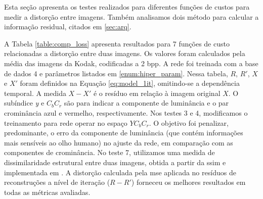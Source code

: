 Esta seção apresenta os testes realizados para diferentes funções de custos para medir a distorção entre imagens. Também analisamos dois método para calcular a informação residual, citados em \ref{sec:arq}.    


A Tabela \ref{table:comp_loss} apresenta resultados para 7 funções de custo relacionadas a distorção entre duas imagens.  Os valores foram calculados pela média das imagens da Kodak, codificadas a 2 bpp. A rede foi treinada com a base de dados 4 e parâmetros listados em \ref{enum:hiper_param}. Nessa tabela, $R$, $R'$, $X$ e $X'$ foram definidos na Equação \ref{eq:model_1it}, omitindo-se a dependência temporal. A medida $X-X'$ é o resíduo em relação à imagem original $X$.  
O subíndice \textit{y} e \textit{$C_bC_r$} são para indicar a componente de luminância e o par crominância azul e vermelho, respectivamente. Nos testes 3 e 4, modificamos o treinamento para rede operar no espaço $YC_bC_r$. O objetivo foi penalizar, predominante, o erro da componente de luminância (que contém informações mais sensíveis ao olho humano) no ajuste da rede, em comparação com as componentes de crominância.
No teste 7, utilizamos uma medida de dissimilaridade estrutural entre duas imagens, obtida a partir da \acrshort{ssim} e implementada em \cite{su2017}.  A distorção calculada pela \acrshort{mse} aplicada no resíduos de reconstruções a nível de iteração ($R-R'$) forneceu os melhores resultados em todas as métricas avaliadas. 


